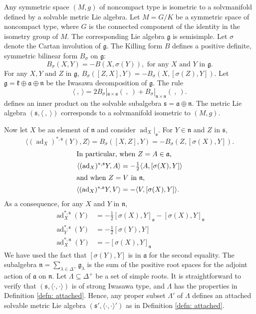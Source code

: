 \documentclass[12pt]{amsart}
\newcommand{\la}{\langle}
\newcommand{\ra}{\rangle}
\newcommand{\fraka}{\ensuremath{\mathfrak{a}} }
\newcommand{\frakg}{\ensuremath{\mathfrak{g}} }
\newcommand{\frakk}{\ensuremath{\mathfrak{k}} }
\newcommand{\frakn}{\ensuremath{\mathfrak{n}} }
\newcommand{\fraks}{\ensuremath{\mathfrak{s}} }
\renewcommand\a{{\mathfrak{a}}}
\newcommand\g{{\mathfrak{g}}}
\newcommand\n{{\mathfrak{n}}}
\newcommand\ip{{\langle\cdot {,} \cdot\rangle}}
\newcommand\ad{\operatorname{ad}}
\theoremstyle{plain}
\theoremstyle{definition}
\theoremstyle{remark}
\numberwithin{equation}{section}
\numberwithin{theorem}{section}
\begin{document}
Any symmetric space $(M,g)$ of noncompact type is isometric to a solvmanifold defined by a solvable metric Lie algebra.  Let  $M = G/K$ be a symmetric space of noncompact type, where $G$ is the connected component of the identity in the isometry group of $M.$   The corresponding Lie algebra  $\g$ is semisimple. Let $\sigma$ denote the Cartan involution of $\frakg$.  The Killing form  $B$ defines  a positive definite,  symmetric bilinear form $B_\sigma$ on $\frakg$: 
$$B_\sigma(X,Y) =  -B(X, \sigma(Y)), \text{ for any $X$ and $Y$ in $\frakg$}.$$ 
For any $X, Y$ and $Z$ in $\g$,
$B_{\sigma} ([Z,X],Y) =-B_{\sigma}(X,[\sigma(Z),Y]).$
Let $\g = \frakk \oplus \a \oplus \n$ be the Iwasawa decomposition of $\frakg.$ 
The rule 
\begin{equation}\label{eqn: symmetric ip} \la ~,~\ra = 2B_\sigma |_{\fraka \times \fraka}(~,~) +  B_\sigma |_{\frakn \times \frakn}(~,~).\end{equation} defines an inner product on the solvable subalgebra $\fraks= \a \oplus \n$. 
The  metric Lie algebra $(\fraks,\la ~,~\ra )$  
corresponds to a  solvmanifold  isometric to $(M,g)$.  

Now let  $X$ be an element of $\frakn$ and consider  $\ad_X|_{\fraks}$.   For $Y \in \frakn$ and $Z $ in $\fraks,$ 
\[ \la (\ad_X)^{*,\fraks}(Y),Z \ra = B_{\sigma}([X,Z],Y) =- B_{\sigma}(Z,[\sigma(X),Y]). \]
\begin{align*}\intertext{In particular, when $Z = A \in \fraka$, }\la (\ad_X)^{\ast,\fraks} Y,A\ra &= 
-\tfrac12\la A,[\sigma(X),Y]\ra  \notag \\
\intertext{and when $Z=V$ in $\frakn$, } \la (\ad_X)^{\ast,\fraks} Y,V\ra &= 
-\la V,[\sigma(X),Y]\ra. \notag 
\end{align*}
As a consequence,  for any $X$ and $Y$ in $\frakn$, 
\begin{align}\label{eqn: ad-star-a-n}
\ad_X^{*,\fraks}(Y) &= -\tfrac12 [\sigma(X), Y]_{\a} -[\sigma(X),Y]_{\n} \\
\ad_Y^{*,\fraks}(Y) &= -\tfrac12 [\sigma(Y), Y] \\
\ad_X^{*,\frakn}(Y) &=  -[\sigma(X),Y]_{\n} 
\end{align}
We have used the fact that $[\sigma(Y),Y]$ is in $\a$ for the second equality. 
The subalgebra $\n = \sum_{\lambda \in \Delta^+} \g_\lambda$ is the sum of the positive root spaces for the adjoint action of $\fraka$ on $\frakn.$ Let $\Lambda \subseteq \Delta^+$ be a set of simple roots. 
 It is straightforward  to verify that $(\fraks, \ip)$ is of strong Iwasawa type, and  $\Lambda$ has the properties in Definition \ref{defn: attached}.  
Hence, any proper
 subset $\Lambda'$ of $\Lambda$ defines an 
 attached solvable metric Lie algebra $(\fraks', \ip')$ as in Definition \ref{defn: attached}.
\end{document}
